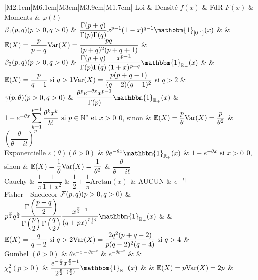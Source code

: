 \documentclass[a4paper, 11pt]{article}
\begin{document}
\begin{tabular}{|M{2.1cm}|M{6.1cm}|M{3cm}|M{3.9cm}|M{1.7cm}|}
\hline
Loi & Densité $f(x)$ & FdR $F(x)$ & Moments & $\varphi(t)$ \\
\hline 
\hline 
$\beta_1(p,q) \newline (p>0, q>0)$ & $\dfrac{\Gamma(p+q)}{\Gamma(p) \Gamma(q)}x^{p-1}(1-x)^{q-1} \mathbbm{1}_{[0,1]}(x)$ & & $\mathbb{E}(X) = \dfrac{p}{p+q} \newline \text{Var}(X) = \dfrac{pq}{(p+q)^2(p+q+1)}$ &  \\
\hline 
$\beta_2(p,q) \newline (p>0, q>0)$ & $\dfrac{\Gamma(p+q)}{\Gamma(p) \Gamma(q)} \dfrac{x^{p-1}}{(1+x)^{p+q}}\mathbbm{1}_{\mathbb{R_+}}(x)$ & & $\mathbb{E}(X) = \dfrac{p}{q-1} \text{ si } q>1 \newline \text{Var}(X) = \dfrac{p(p+q-1)}{(q-2)(q-1)^2}$ si $q>2$ &  \\
\hline
$\gamma(p,\theta) \newline (p>0, q>0)$ & $\dfrac{\theta^p e^{-\theta x}x^{p-1}}{\Gamma(p)} \mathbbm{1}_{\mathbb{R_+}}(x)$ & $1-e^{-\theta x} \displaystyle \sum \limits_{k=1}^{p-1} \dfrac{\theta^k x^k}{k!} \newline \text{ si } p \in \mathbb{N}^* \text{ et } x>0 \newline$ 0, sinon & $\mathbb{E}(X) = \dfrac{p}{\theta} \newline \text{Var}(X) = \dfrac{p}{\theta^2}$ & $\left(\dfrac{\theta}{\theta-it} \right)^p$ \\
\hline
Exponentielle $\varepsilon(\theta) (\theta > 0)$ & $\theta e^{-\theta x} \mathbbm{1}_{\mathbb{R_+}}(x)$ & $1-e^{-\theta x} \text{ si } x>0 \newline$ 0, sinon & $\mathbb{E}(X) = \dfrac{1}{\theta} \newline \text{Var}(X) = \dfrac{1}{\theta^2}$ & $\dfrac{\theta}{\theta-it} $ \\
\hline
Cauchy & $\dfrac{1}{\pi} \dfrac{1}{1+x^2}$ & $\dfrac{1}{2} + \dfrac{1}{\pi} \text{Arctan}(x)$ & AUCUN & $e^{-\vert t \vert} $ \\
\hline
Fisher - Snedecor $\mathcal{F}(p,q) \newline (p>0, q>0)$ & $p^{\frac{p}{2}}q^{\frac{q}{2}}  \dfrac{\Gamma \left( \dfrac{p+q}{2} \right)}{\Gamma \left(\dfrac{p}{2} \right) \Gamma \left( \dfrac{q}{2} \right)} \dfrac{x^{\frac{p}{2}-1}}{(q+px)^{\frac{p+q}{2}}}\mathbbm{1}_{\mathbb{R_+}}(x)$ &  & $\mathbb{E}(X)=\dfrac{q}{q-2} \text{ si } q>2 \newline \text{Var}(X)=\dfrac{2q^2(p+q-2)}{p(q-2)^2(q-4)} \text{ si } q > 4$ &\\
\hline
Gumbel $(\theta > 0)$ & $\theta e^{-x-\theta e^{-x}}$	& $e^{-\theta e^{-x}}$ & & \\
\hline
$\chi^2_p (p >0)$ & $\dfrac{e^{-\frac{x}{2}} x^{\frac{p}{2}-1}}{2^{\frac{p}{2}\Gamma (\frac{p}{2})}} \mathbbm{1}_{\mathbb{R}_+}(x)$ & & $\mathbb{E}(X)=p \newline \text{Var}(X)=2p$ & \\
\hline
\end{tabular}
\end{document}
